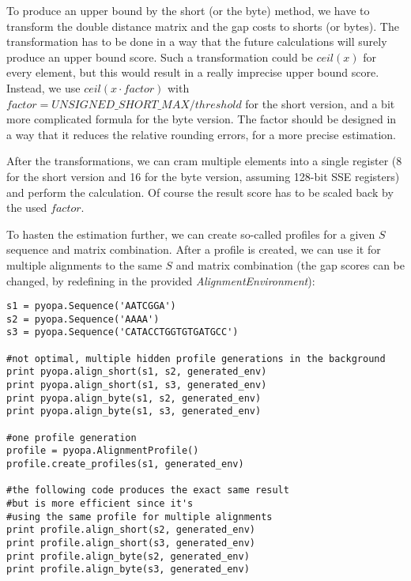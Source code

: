 \documentclass[12pt]{article}
\newcommand{\alenv}{\emph{AlignmentEnvironment}}
\begin{document}
To produce an upper bound by the short (or the byte) method, we have to transform the double distance matrix and the gap costs to shorts (or bytes). The transformation has to be done in a way that the future calculations will surely produce an upper bound score. Such a transformation could be $ceil(x)$ for every element, but this would result in a really imprecise upper bound score. Instead, we use $ceil(x \cdot factor)$ with $factor=UNSIGNED\_SHORT\_MAX / threshold$ for the short version, and a bit more complicated formula for the byte version. The factor should be designed in a way that it reduces the relative rounding errors, for a more precise estimation.

After the transformations, we can cram multiple elements into a single register (8 for the short version and 16 for the byte version, assuming 128-bit SSE registers) and perform the calculation. Of course the result score has to be scaled back by the used $factor$.

To hasten the estimation further, we can create so-called profiles for a given $S$ sequence and matrix combination. After a profile is created, we can use it for multiple alignments to the same $S$ and matrix combination (the gap scores can be changed, by redefining in the provided \alenv{}):

\begin{lstlisting}
s1 = pyopa.Sequence('AATCGGA')
s2 = pyopa.Sequence('AAAA')
s3 = pyopa.Sequence('CATACCTGGTGTGATGCC')

#not optimal, multiple hidden profile generations in the background
print pyopa.align_short(s1, s2, generated_env)
print pyopa.align_short(s1, s3, generated_env)
print pyopa.align_byte(s1, s2, generated_env)
print pyopa.align_byte(s1, s3, generated_env)

#one profile generation
profile = pyopa.AlignmentProfile()
profile.create_profiles(s1, generated_env)

#the following code produces the exact same result
#but is more efficient since it's
#using the same profile for multiple alignments
print profile.align_short(s2, generated_env)
print profile.align_short(s3, generated_env)
print profile.align_byte(s2, generated_env)
print profile.align_byte(s3, generated_env)
\end{lstlisting}
\end{document}
